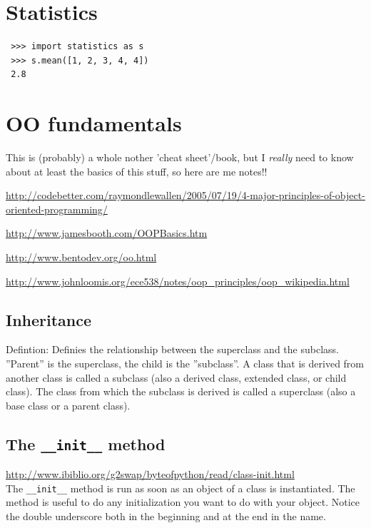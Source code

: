\documentclass[11pt,a4paper]{article}
\begin{document}
\newpage
\section{Statistics}
 \begin{lstlisting}
 >>> import statistics as s
 >>> s.mean([1, 2, 3, 4, 4])
 2.8
 \end{lstlisting}



\newpage
\section{OO fundamentals}
This is (probably) a whole nother 'cheat sheet'/book, but I {\it really} need to know about at least the basics of this stuff, so here are me notes!!

\smallskip
\smallskip
\noindent
\href{http://codebetter.com/raymondlewallen/2005/07/19/4-major-principles-of-object-oriented-programming/}{http://codebetter.com/raymondlewallen/2005/07/19/4-major-principles-of-object-oriented-programming/}

\smallskip
\smallskip
\noindent
\href{http://www.jamesbooth.com/OOPBasics.htm}{http://www.jamesbooth.com/OOPBasics.htm}

\smallskip
\smallskip
\noindent
\href{http://www.bentodev.org/oo.html}{http://www.bentodev.org/oo.html}

\smallskip
\smallskip
\noindent
\href{http://www.johnloomis.org/ece538/notes/oop\_principles/oop\_wikipedia.html}{http://www.johnloomis.org/ece538/notes/oop\_principles/oop\_wikipedia.html}


    \subsection{Inheritance}
    Defintion: Definies the relationship between the superclass and the subclass. \\
    ''Parent'' is the superclass, the child is the ''subclass''. 
    A class that is derived from another class is called a subclass (also a derived class, extended class, or child class). The class from which the subclass is derived is called a superclass (also a base class or a parent class).
    
    \subsection{The {\tt \_\_init\_\_} method}
    \href{http://www.ibiblio.org/g2swap/byteofpython/read/class-init.html}{http://www.ibiblio.org/g2swap/byteofpython/read/class-init.html}\\
    The {\tt \_\_init\_\_} method is run as soon as an object of a
class is instantiated. The method is useful to do any initialization
you want to do with your object. Notice the double underscore both in
the beginning and at the end in the name.
\end{document}
